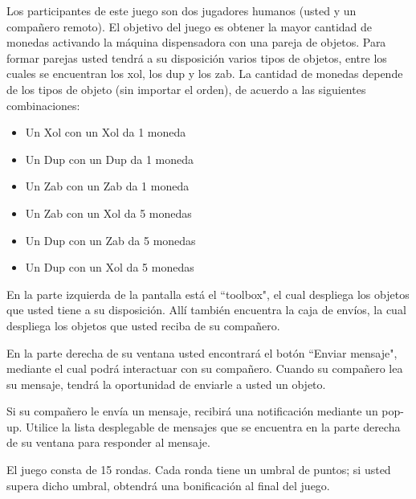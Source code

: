 \documentclass{article}
\begin{document}
\begin{multicols}{2}{
\noindent Los participantes de este juego son dos jugadores humanos (usted y un compañero remoto). El objetivo del juego es obtener la mayor cantidad de monedas activando la máquina dispensadora con una pareja de objetos. Para formar parejas usted tendrá a su disposición varios tipos de objetos, entre los cuales se encuentran los xol, los dup y los zab. La cantidad de monedas depende de los tipos de objeto (sin importar el orden), de acuerdo a las siguientes combinaciones:
%
\begin{itemize}
\item Un Xol con un Xol da 1 moneda
\item Un Dup con un Dup da 1 moneda
\item Un Zab con un Zab da 1 moneda
\item Un Zab con un Xol da 5 monedas
\item Un Dup con un Zab da 5 monedas
\item Un Dup con un Xol da 5 monedas
\end{itemize}
%
En la parte izquierda de la pantalla está el ``toolbox", el cual despliega los objetos que usted tiene a su disposición. Allí también encuentra la caja de envíos, la cual despliega los objetos que usted reciba de su compañero.

\vspace{0.5\baselineskip}

\noindent En la parte derecha de su ventana usted encontrará el botón ``Enviar mensaje", mediante el cual podrá interactuar con su compañero. Cuando su compañero lea su mensaje, tendrá la oportunidad de enviarle a usted un objeto.

\vspace{0.5\baselineskip}

\noindent Si su compañero le envía un mensaje, recibirá una notificación mediante un pop-up. Utilice la lista desplegable de mensajes que se encuentra en la parte derecha de su ventana para responder al mensaje.

\vspace{0.5\baselineskip}

\noindent El juego consta de 15 rondas. Cada ronda tiene un umbral de puntos; si usted supera dicho umbral, obtendrá una bonificación al final del juego.
}\end{multicols}

\
\end{document}
